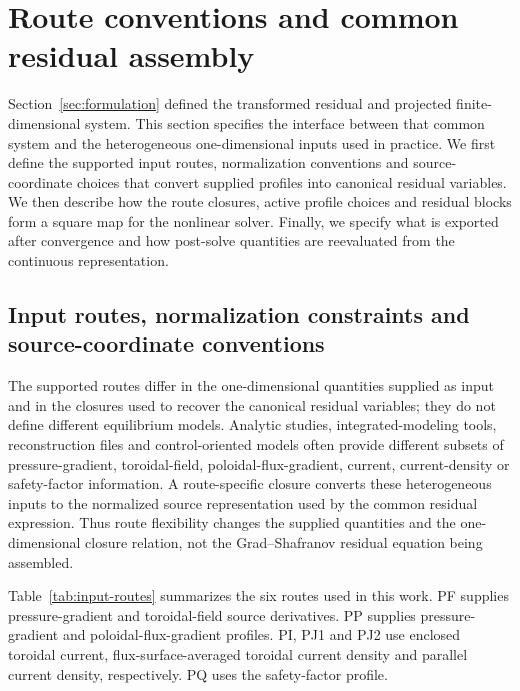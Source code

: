\documentclass[final, 3p, times]{elsarticle}
\begin{document}
\section{Route conventions and common residual assembly}
\label{sec:routes}

Section~\ref{sec:formulation} defined the transformed residual and projected finite-dimensional system. This section specifies the interface between that common system and the heterogeneous one-dimensional inputs used in practice. We first define the supported input routes, normalization conventions and source-coordinate choices that convert supplied profiles into canonical residual variables. We then describe how the route closures, active profile choices and residual blocks form a square map for the nonlinear solver. Finally, we specify what is exported after convergence and how post-solve quantities are reevaluated from the continuous representation.

\subsection{Input routes, normalization constraints and source-coordinate conventions}
\label{sec:input-routes}

The supported routes differ in the one-dimensional quantities supplied as input and in the closures used to recover the canonical residual variables; they do not define different equilibrium models. Analytic studies, integrated-modeling tools, reconstruction files and control-oriented models often provide different subsets of pressure-gradient, toroidal-field, poloidal-flux-gradient, current, current-density or safety-factor information. A route-specific closure converts these heterogeneous inputs to the normalized source representation used by the common residual expression. Thus route flexibility changes the supplied quantities and the one-dimensional closure relation, not the Grad--Shafranov residual equation being assembled.

Table~\ref{tab:input-routes} summarizes the six routes used in this work. PF supplies pressure-gradient and toroidal-field source derivatives. PP supplies pressure-gradient and poloidal-flux-gradient profiles. PI, PJ1 and PJ2 use enclosed toroidal current, flux-surface-averaged toroidal current density and parallel current density, respectively. PQ uses the safety-factor profile.
\end{document}
